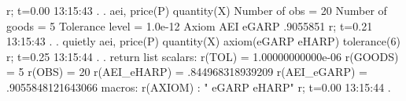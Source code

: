 r; t=0.00 13:15:43
{\smallskip}
. 
. aei, price(P) quantity(X)
{\smallskip}
    Number of obs           =         20 
    Number of goods         =          5 
    Tolerance level         =    1.0e-12 
{\smallskip}
       Axiom {\VBAR}       AEI 
       eGARP {\VBAR}  .9055851 
r; t=0.21 13:15:43
{\smallskip}
. 
. quietly aei, price(P) quantity(X) axiom(eGARP eHARP) tolerance(6)
r; t=0.25 13:15:44
{\smallskip}
. 
. return list
{\smallskip}
scalars:
                r(TOL) =  1.00000000000e-06
              r(GOODS) =  5
                r(OBS) =  20
          r(AEI_eHARP) =  .844968318939209
          r(AEI_eGARP) =  .9055848121643066
{\smallskip}
macros:
              r(AXIOM) : " eGARP eHARP"
r; t=0.00 13:15:44
{\smallskip}
. 

